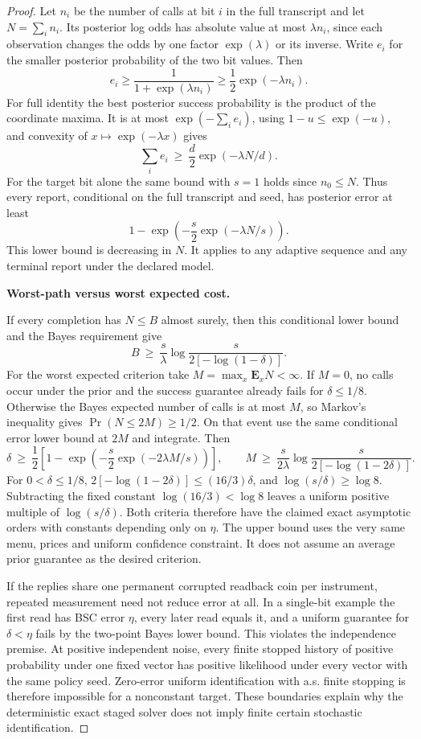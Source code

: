 \begin{proof}
Let \(n_i\) be the number of calls at bit \(i\) in the full transcript and let \(N=\sum_i n_i\). Its posterior log odds has absolute value at most \(\lambda n_i\), since each observation changes the odds by one factor \(\exp(\lambda)\) or its inverse. Write \(e_i\) for the smaller posterior probability of the two bit values. Then
\[
 e_i\ge \frac{1}{1+\exp(\lambda n_i)}\ge \frac12\exp(-\lambda n_i).
\]
For full identity the best posterior success probability is the product of the coordinate maxima. It is at most \(\exp(-\sum_i e_i)\), using \(1-u\le \exp(-u)\), and convexity of \(x\mapsto \exp(-\lambda x)\) gives
\[
 \sum_i e_i \ \ge\ \frac{d}{2}\exp(-\lambda N/d).
\]
For the target bit alone the same bound with \(s=1\) holds since \(n_0\le N\). Thus every report, conditional on the full transcript and seed, has posterior error at least
\[
 1-\exp\!\left(-\frac{s}{2}\exp(-\lambda N/s)\right).
\]
This lower bound is decreasing in \(N\). It applies to any adaptive sequence and any terminal report under the declared model.

\textbf{Worst-path versus worst expected cost.}

If every completion has \(N\le B\) almost surely, then this conditional lower bound and the Bayes requirement give
\[
 B\ \ge\ \frac{s}{\lambda}\log\frac{s}{2[-\log(1-\delta)]}.
\]
For the worst expected criterion take \(M=\max_x \mathbf E_x N<\infty\). If \(M=0\), no calls occur under the prior and the success guarantee already fails for \(\delta\le1/8\). Otherwise the Bayes expected number of calls is at most \(M\), so Markov's inequality gives \(\Pr(N\le2M)\ge1/2\). On that event use the same conditional error lower bound at \(2M\) and integrate. Then
\[
 \delta\ \ge\ \frac12\left[1-\exp\!\left(-\frac{s}{2}\exp(-2\lambda M/s)\right)\right],\qquad
 M\ \ge\ \frac{s}{2\lambda}\log\frac{s}{2[-\log(1-2\delta)]}.
\]
For \(0<\delta\le1/8\), \(2[-\log(1-2\delta)]\le (16/3)\delta\), and \(\log(s/\delta)\ge\log 8\). Subtracting the fixed constant \(\log(16/3)<\log 8\) leaves a uniform positive multiple of \(\log(s/\delta)\). Both criteria therefore have the claimed exact asymptotic orders with constants depending only on \(\eta\). The upper bound uses the very same menu, prices and uniform confidence constraint. It does not assume an average prior guarantee as the desired criterion.

If the replies share one permanent corrupted readback coin per instrument, repeated measurement need not reduce error at all. In a single-bit example the first read has BSC error \(\eta\), every later read equals it, and a uniform guarantee for \(\delta<\eta\) fails by the two-point Bayes lower bound. This violates the independence premise. At positive independent noise, every finite stopped history of positive probability under one fixed vector has positive likelihood under every vector with the same policy seed. Zero-error uniform identification with a.s. finite stopping is therefore impossible for a nonconstant target. These boundaries explain why the deterministic exact staged solver does not imply finite certain stochastic identification.


\end{proof}
